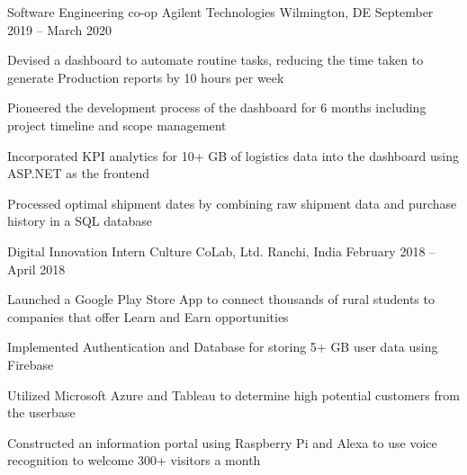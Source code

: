 \begin{cventries}
	\vspace{-2mm}
	\cventry
	{Software Engineering co-op}
	{Agilent Technologies}
	{Wilmington, DE}
	{September 2019 – March 2020}
	{\begin{cvitems}
	    \item {Devised a dashboard to automate routine tasks, reducing the time taken to generate Production reports by 10 hours per week}
        \item {Pioneered the development process of the dashboard for 6 months including project timeline and scope management}
		\item {Incorporated KPI analytics for 10+ GB of logistics data into the dashboard using ASP.NET as the frontend}
        \item {Processed optimal shipment dates by combining raw shipment data and purchase history in a SQL database}
		\end{cvitems}}
	
	
	\vspace{-2mm}
	\cventry
	{Digital Innovation Intern}
	{Culture CoLab, Ltd.}
	{Ranchi, India}
	{February 2018 – April 2018}
	{\begin{cvitems}
		\item {Launched a Google Play Store App to connect thousands of rural students to companies that offer Learn and Earn opportunities}
		\item {Implemented Authentication and Database for storing 5+ GB user data using Firebase}
		\item {Utilized Microsoft Azure and Tableau to determine high potential customers from the userbase}
		\item {Constructed an information portal using Raspberry Pi and Alexa to use voice recognition to welcome 300+ visitors a month}
		\end{cvitems}}

\end{cventries}
